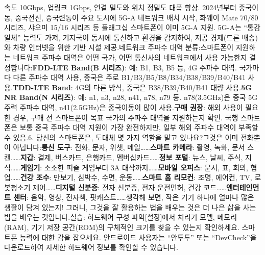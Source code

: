 속도 10Gbps, 업링크 1Gbps, 연결 밀도와 위치 정밀도 대폭 향상. 2024년부터 중국이동, 중국전신, 중국련통이 주요 도시에 5G-A 네트워크 배치 시작, 화웨이 Mate 70/80 시리즈, 샤오미 15/16 시리즈 등 플래그십 스마트폰이 이미 5G-A 지원. 5G-A는 “통감일체” 능력도 가져, 기지국이 동시에 통신하고 환경을 감지하여, 저공 경제(드론 배송)와 차량 인터넷을 위한 기반 시설 제공.네트워크 주파수 대역 분류:스마트폰이 지원하는 네트워크 주파수 대역은 어떤 국가, 어떤 통신사의 네트워크에서 사용 가능한지 결정합니다:\textbf{FDD-LTE Band(B 시리즈)}: 예: B1, B3, B5 등, 4G 주파수 대역. 국가마다 다른 주파수 대역 사용, 중국은 주로 B1/B3/B5/B8/B34/B38/B39/B40/B41 사용.\textbf{TDD-LTE Band}: 4G의 다른 방식, 중국은 B38/B39/B40/B41 대량 사용.\textbf{5G NR Band(N 시리즈)}: 예: n1, n3, n28, n41, n78, n79 등. n78(3.5GHz)은 중국 5G 주력 주파수 대역, n41(2.5GHz)은 중국이동이 많이 사용.\textbf{구매 권장}: 해외 사용이 필요한 경우, 구매 전 스마트폰이 목표 국가의 주파수 대역을 지원하는지 확인. 국행 스마트폰은 보통 중국 주파수 대역 지원이 가장 완전하지만, 일부 해외 주파수 대역이 부족할 수 있음.6. 당신의 스마트폰은, 도대체 몇 가지 역할을 맡고 있나요?그것은 이미 전화뿐이 아닙니다:\textbf{통신 도구}: 전화, 문자, 위챗, 메일……\textbf{스마트 카메라}: 촬영, 녹화, 문서 스캔……\textbf{지갑}: 결제, 버스카드, 은행카드, 멤버십카드……\textbf{정보 포털}: 뉴스, 날씨, 주식, 지식……\textbf{게임기}: 소소한 퍼즐 게임부터 3A 대작까지……\textbf{모바일 오피스}: 문서, 표, 회의, 협업……\textbf{건강 조수}: 만보기, 심박수, 수면, 운동……\textbf{스마트 홈 리모컨}: 조명, 에어컨, TV, 로봇청소기 제어……\textbf{디지털 신분증}: 전자 신분증, 전자 운전면허, 건강 코드……\textbf{엔터테인먼트 센터}: 음악, 영상, 전자책, 팟캐스트……생각해 보면, 작은 기기 하나에 얼마나 많은 생활이 담겨 있는지! 그러니, 그것을 잘 활용하는 법을 배우는 것은 더 나은 삶을 사는 법을 배우는 것입니다.실습: 하드웨어 구성 파악[설정]에서 처리기 모델, 메모리(RAM), 기기 저장 공간(ROM)의 구체적인 크기를 찾을 수 있는지 확인하세요. 스마트폰 능력에 대한 감을 잡으세요. 안드로이드 사용자는 “안투투” 또는 “DevCheck”을 다운로드하여 자세한 하드웨어 정보를 확인할 수 있습니다.

